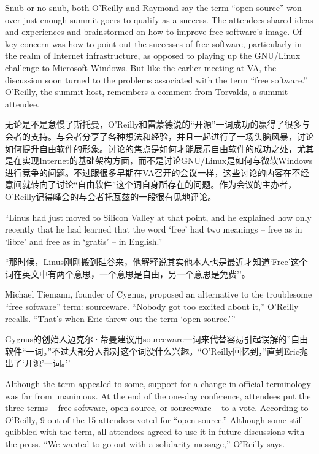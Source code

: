 \ifdefined\eng
Snub or no snub, both O'Reilly and Raymond say the term ``open source'' won over just enough summit-goers to qualify as a success. The attendees shared ideas and experiences and brainstormed on how to improve free software's image. Of key concern was how to point out the successes of free software, particularly in the realm of Internet infrastructure, as opposed to playing up the GNU/Linux challenge to Microsoft Windows. But like the earlier meeting at VA, the discussion soon turned to the problems associated with the term ``free software.'' O'Reilly, the summit host, remembers a comment from Torvalds, a summit attendee.
\fi

\ifdefined\chs
无论是不是怠慢了斯托曼，O'Reilly和雷蒙德说的``开源''一词成功的赢得了很多与会者的支持。与会者分享了各种想法和经验，并且一起进行了一场头脑风暴，讨论如何提升自由软件的形象。讨论的焦点是如何才能展示自由软件的成功之处，尤其是在实现Internet的基础架构方面，而不是讨论GNU/Linux是如何与微软Windows进行竞争的问题。不过跟很多早期在VA召开的会议一样，这些讨论的内容在不经意间就转向了讨论``自由软件''这个词自身所存在的问题。作为会议的主办者，O'Reilly记得峰会的与会者托瓦兹的一段很有见地评论。
\fi

\ifdefined\eng
``Linus had just moved to Silicon Valley at that point, and he explained how only recently that he had learned that the word `free' had two meanings -- free as in `libre' and free as in `gratis' -- in English.''
\fi

\ifdefined\chs
``那时候，Linus刚刚搬到硅谷来，他解释说其实他本人也是最近才知道`Free'这个词在英文中有两个意思，一个意思是自由，另一个意思是免费''。
\fi

\ifdefined\eng
Michael Tiemann, founder of Cygnus, proposed an alternative to the troublesome ``free software'' term: sourceware. ``Nobody got too excited about it,'' O'Reilly recalls. ``That's when Eric threw out the term `open source.'\hspace{0.01in}''
\fi

\ifdefined\chs
Gygnus的创始人迈克尔·蒂曼建议用sourceware一词来代替容易引起误解的''自由软件``一词。''不过大部分人都对这个词没什么兴趣。``O'Reilly回忆到，''直到Eric抛出了`开源'一词。''
\fi

\ifdefined\eng
Although the term appealed to some, support for a change in official terminology was far from unanimous. At the end of the one-day conference, attendees put the three terms -- free software, open source, or sourceware -- to a vote. According to O'Reilly, 9 out of the 15 attendees voted for ``open source.'' Although some still quibbled with the term, all attendees agreed to use it in future discussions with the press. ``We wanted to go out with a solidarity message,'' O'Reilly says.
\fi

